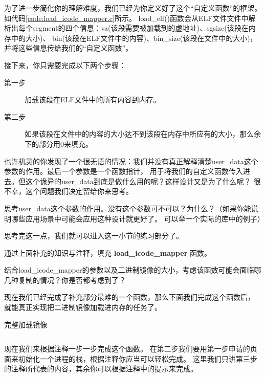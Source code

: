 为了进一步简化你的理解难度，我们已经为你定义好了这个“自定义函数”的框架。如代码\ref{code:load_icode_mapper.c}所示。
load\_elf()函数会从ELF文件文件中解析出每个segment的四个信息：va(该段需要被加载到的虚地址)、sgsize(该段在内存中的大小)、
bin(该段在ELF文件中的内容)、bin\_size(该段在文件中的大小)，并将这些信息传给我们的“自定义函数”。

接下来，你只需要完成以下两个步骤：

\begin{description}
  \item[第一步] 加载该段在ELF文件中的所有内容到内存。
  \item[第二步] 如果该段在文件中的内容的大小达不到该段在内存中所应有的大小，那么余下的部分用0来填充。
\end{description}

也许机灵的你发现了一个很无语的情况：我们并没有真正解释清楚user\_data这个参数的作用。最后一个参数是一个函数指针，
用于将我们的自定义函数传入进去。但这个诡异的user\_data到底是做什么用的呢？这样设计又是为了什么呢？
很不幸，这个问题我们决定留给你来思考。

\begin{thinking}\label{think-user-data}
思考user\_data这个参数的作用。没有这个参数可不可以？为什么？（如果你能说明哪些应用场景中可能会应用这种设计就更好了。
可以举一个实际的库中的例子）
\end{thinking}

思考完这一点，我们就可以进入这一小节的练习部分了。

\begin{exercise}
通过上面补充的知识与注释，填充 \textbf{load\_icode\_mapper} 函数。
\end{exercise}

\begin{thinking}\label{think-load-icode}
    结合load\_icode\_mapper的参数以及二进制镜像的大小，考虑该函数可能会面临哪几种复制的情况？你是否都考虑到了？
\end{thinking}

现在我们已经完成了补充部分最难的一个函数，那么下面我们完成这个函数后，
就能真正实现把二进制镜像加载进内存的任务了。

\begin{codeBoxWithCaption}{完整加载镜像\label{code:load_icode.c}}
  \inputminted[linenos]{c}{codes/load_icode.c}
\end{codeBoxWithCaption}

现在我们来根据注释一步一步完成这个函数。
在第二步我们要用第一步申请的页面来初始化一个进程的栈，根据注释你应当可以轻松完成。
这里我们只讲第三步的注释所代表的内容，其余你可以根据注释中的提示来完成。

